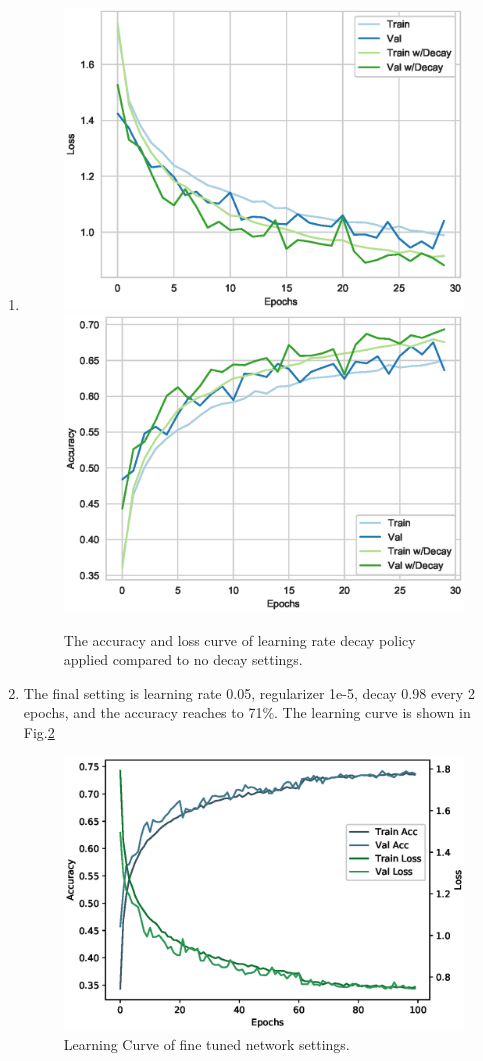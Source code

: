 \documentclass[11pt]{article}
\begin{document}
\begin{enumerate}
\begin{enumerate}
    \item  
    
    \begin{figure}[h]
        \centering
        \includegraphics[width=0.45\linewidth]{BN01DECAY_Loss.eps}
        \includegraphics[width=0.45\linewidth]{BN01DECAY_Acc.eps}
        \caption{ The accuracy and loss curve of learning rate decay policy applied compared to no decay settings.}
        \label{fig:lr_decay}
    \end{figure}
    
    \item The final setting is learning rate 0.05, regularizer 1e-5, decay 0.98 every 2 epochs, and the accuracy reaches to 71\%. The learning curve is shown in Fig.\ref{fig:finetune}
    \begin{figure}[h]
        \centering
        \includegraphics[width=0.6\linewidth]{learn_curve_fintune.eps}
        \caption{Learning Curve of fine tuned network settings.}
        \label{fig:finetune}
    \end{figure}
\end{enumerate}



\end{enumerate}
\end{document}
